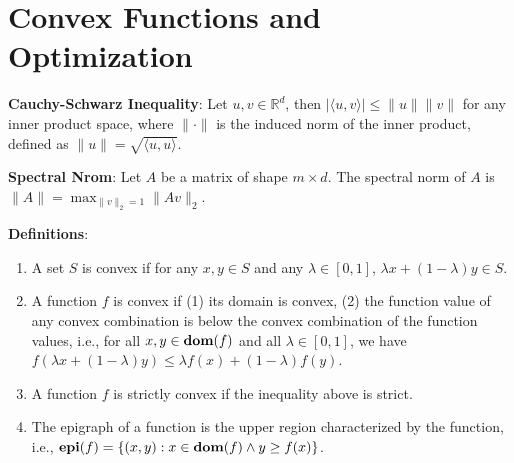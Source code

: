 \section{Convex Functions and Optimization}

\textbf{Cauchy-Schwarz Inequality}: Let $u, v \in \mathbb{R}^d$, then $|\langle u,v\rangle| \le \|u\| \|v\|$ for any inner product space, where $\|\cdot\|$ is the induced norm of the inner product, defined as $\|u\| = \sqrt{\langle u,u\rangle}$.

\textbf{Spectral Nrom}: Let $A$ be a matrix of shape $m\times d$. The spectral norm of $A$ is $\|A\| = \max_{\|v\|_2=1} \|Av\|_2$.

\textbf{Definitions}:
\begin{enumerate}
    \item A set $S$ is convex if for any $x, y\in S$ and any $\lambda \in [0,1]$, $\lambda x + (1-\lambda) y \in S$.
    \item A function $f$ is convex if (1) its domain is convex, (2) the function value of any convex combination is below the convex combination of the function values, i.e., for all $x, y \in \operatorname{\textbf{dom}}(f)$ and all $\lambda \in [0,1]$, we have $f(\lambda x + (1-\lambda) y) \le \lambda f(x) + (1-\lambda) f(y)$.
    \item A function $f$ is strictly convex if the inequality above is strict.
    \item The epigraph of a function is the upper region characterized by the function, i.e., $\operatorname{\textbf{epi}}(f) = \{(x, y): x \in \operatorname{\textbf{dom}}(f) \land y \ge f(x) \}$.
\end{enumerate}

